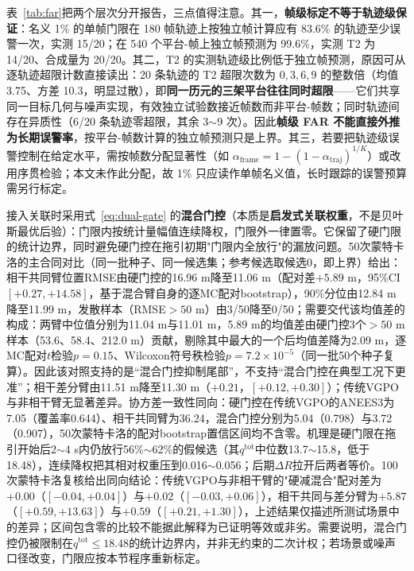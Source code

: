 \documentclass[UTF8,a4paper,zihao=-4]{ctexart}
\begin{document}
表~\ref{tab:far}把两个层次分开报告，三点值得注意。其一，\textbf{帧级标定不等于轨迹级保证}：名义 1\% 的单帧门限在 180 帧轨迹上按独立帧计算应有 83.6\% 的轨迹至少误警一次，实测 15/20；在 540 个平台-帧上独立帧预测为 99.6\%，实测 T2 为 14/20、合成量为 20/20。其二，T2 的实测轨迹级比例低于独立帧预测，原因可从逐轨迹超限计数直接读出：20 条轨迹的 T2 超限次数为 $0,3,6,9$ 的整数倍（均值 3.75、方差 10.3，明显过散），即\textbf{同一历元的三架平台往往同时超限}——它们共享同一目标几何与噪声实现，有效独立试验数接近帧数而非平台-帧数；同时轨迹间存在异质性（6/20 条轨迹零超限，其余 3$\sim$9 次）。因此\textbf{帧级 FAR 不能直接外推为长期误警率}，按平台-帧数计算的独立帧预测只是上界。其三，若要把轨迹级误警控制在给定水平，需按帧数分配显著性（如 $\alpha_{\mathrm{frame}}=1-(1-\alpha_{\mathrm{traj}})^{1/K}$）或改用序贯检验；本文未作此分配，故 1\% 只应读作单帧名义值，长时跟踪的误警预算需另行标定。

接入关联时采用式~\eqref{eq:dual-gate} 的\textbf{混合门控}（本质是\textbf{启发式关联权重}，不是贝叶斯最优后验）：门限内按统计量幅值连续降权，门限外一律置零。它保留了硬门限的统计边界，同时避免硬门控在拖引初期"门限内全放行"的漏放问题。50次蒙特卡洛的主合同对比（同一批种子、同一候选集；参考候选取候选0，即上界）给出：相干共同臂位置RMSE由硬门控的16.96 m降至11.06 m（配对差\(+5.89\) m，95\%CI \([+0.27,+14.58]\)，基于混合臂自身的逐MC配对bootstrap），90\%分位由12.84 m降至11.99 m，发散样本（RMSE\(>50\) m）由3/50降至0/50；需要交代该均值差的构成：两臂中位值分别为11.04 m与11.01 m，5.89 m的均值差由硬门控3个\(>50\) m样本（53.6、58.4、212.0 m）贡献，剔除其中最大的一个后均值差降为2.09 m，逐MC配对\(t\)检验\(p=0.15\)、Wilcoxon符号秩检验\(p=7.2\times10^{-5}\)（同一批50个种子复算）。因此该对照支持的是“混合门控抑制尾部”，不支持“混合门控在典型工况下更准”；相干差分臂由11.51 m降至11.30 m（\(+0.21\)，\([+0.12,+0.30]\)）；传统VGPO与非相干臂无显著差异。协方差一致性同向：硬门控在传统VGPO的ANEES3为7.05（覆盖率0.644）、相干共同臂为36.24，混合门控分别为5.04（0.798）与3.72（0.907），50次蒙特卡洛的配对bootstrap置信区间均不含零。机理是硬门限在拖引开始后2\(\sim\)4 s内仍放行56\%\(\sim\)62\%的假候选（其\(q^{\mathrm{tot}}\)中位数13.7\(\sim\)15.8，低于18.48），连续降权把其相对权重压到0.016\(\sim\)0.056；后期\(\Delta R\)拉开后两者等价。100次蒙特卡洛复核给出同向结论：传统VGPO与非相干臂的"硬减混合"配对差为\(+0.00\)（\([-0.04,+0.04]\)）与\(+0.02\)（\([-0.03,+0.06]\)），相干共同与差分臂为\(+5.87\)（\([+0.59,+13.63]\)）与\(+0.59\)（\([+0.21,+1.30]\)），上述结果仅描述所测试场景中的差异；区间包含零的比较不能据此解释为已证明等效或非劣。需要说明，混合门控仍被限制在\(q^{\mathrm{tot}}\le18.48\)的统计边界内，并非无约束的二次计权；若场景或噪声口径改变，门限应按本节程序重新标定。
\end{document}
